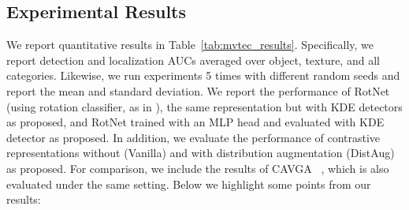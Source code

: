 \documentclass{article} \usepackage{iclr2021_conference,times}
\begin{document}
\subsection{Experimental Results}
\label{sec:app_mvtec_results}

\begin{table}[ht]
    \centering
    \caption{Image-level detection and pixel-level localization AUC results on MVTec anomaly detection dataset. We run experiments 5 times with different random seeds and report the mean and standard deviations. We bold-face the best entry of each row and those within the standard deviation.}
    \label{tab:mvtec_results}
\end{table}

We report quantitative results in Table~\ref{tab:mvtec_results}. Specifically, we report detection and localization AUCs averaged over object, texture, and all categories. Likewise, we run experiments 5 times with different random seeds and report the mean and standard deviation.
We report the performance of RotNet (using rotation classifier, as in \cite{golan2018deep,hendrycks2019using}), the same representation but with KDE detectors as proposed, and RotNet trained with an MLP head and evaluated with KDE detector as proposed. In addition, we evaluate the performance of contrastive representations without (Vanilla) and with distribution augmentation (DistAug) as proposed. For comparison, we include the results of CAVGA ~\cite{venkataramanan2019attention}, which is also evaluated under the same setting. Below we highlight some points from our results:
\end{document}
